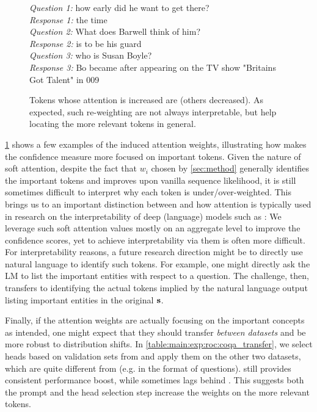 \begin{figure}[ht]
\begin{small}
  \begin{framed}
\textit{Question 1:} how early did he want to get there?\\
\textit{Response 1:}  the time\\
\textit{Question 2:} What does Barwell think of him?\\
\textit{Response 2:}  is  to be his guard\\
\textit{Question 3:} who is Susan Boyle?\\
\textit{Response 3:}  Bo became  after appearing on the TV show "Britains Got Talent" in 009
  \end{framed}
  \end{small}
\caption{
Tokens whose attention is increased are  (others decreased).
As expected, such re-weighting are not always interpretable, but help locating the more relevant tokens in general.
}\label{fig:main:case}
\end{figure}
\cref{fig:main:case} shows a few examples of the induced attention weights, illustrating how \methodname makes the confidence measure more focused on important tokens.
Given the nature of soft attention, despite the fact that $w_i$ chosen by \cref{sec:method} generally identifies the important tokens and improves upon vanilla sequence likelihood, it is still sometimes difficult to interpret why each token is under/over-weighted. 
This brings us to an important distinction between \methodname and how attention is typically used in research on the interpretability of deep (language) models such as \cite{10.1145/3357384.3358028,biju-etal-2022-input}: We leverage such soft attention values mostly on an aggregate level to improve the confidence scores, yet to achieve interpretability via them is often more difficult.
For interpretability reasons, a future research direction might be to directly use natural language to identify such tokens. 
For example, one might directly ask the LM to list the important entities with respect to a question.
The challenge, then, transfers to identifying the actual tokens implied by the natural language output listing important entities in the original $\mathbf{s}$.

Finally, if the attention weights are actually focusing on the important concepts as intended, one might expect that they should transfer \textit{between datasets} and be more robust to distribution shifts.
In \cref{table:main:exp:roc:coqa_transfer}, we select heads based on validation sets from \datasetcoqa and apply them on the other two datasets, which are quite different from \datasetcoqa (e.g. in the format of questions).
\methodnamePrompt still provides consistent performance boost, while \methodnameNext sometimes lags behind \baselineNLLNorm.
This suggests both the prompt and the head selection step increase the weights on the more relevant tokens.


